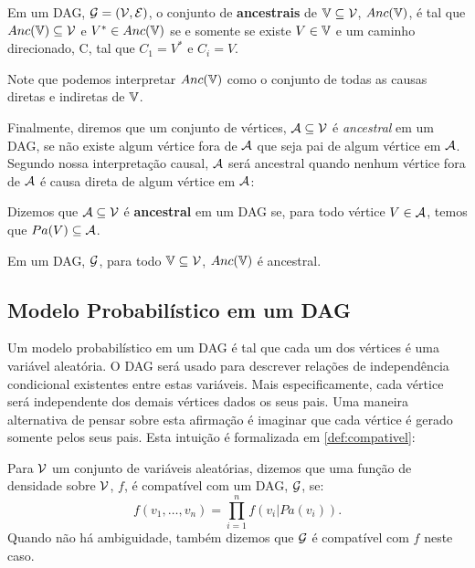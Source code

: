 \begin{definition}
 \label{def:ancestrais}
 Em um DAG, ${\mathcal G} = ({\mathcal V}, {\mathcal E})$,
 o conjunto de \textbf{ancestrais} de ${\mathbb V} \subseteq {\mathcal V}$, 
 $Anc({\mathbb V})$, é tal que
 $Anc({\mathbb V}) \subseteq {\mathcal V}$ e
 $V^* \in Anc({\mathbb V})$ se e somente se existe
 $V \in {\mathbb V}$ e
 um caminho direcionado, C, tal que
 $C_1 = V^*$ e $C_i = V$.
\end{definition}

Note que podemos interpretar $Anc({\mathbb V})$ como
o conjunto de todas as causas diretas e indiretas de ${\mathbb V}$.

Finalmente, diremos que um conjunto de vértices,
${\mathcal A} \subseteq {\mathcal V}$ é \textit{ancestral} em um DAG,
se não existe algum vértice fora de ${\mathcal A}$ que
seja pai de algum vértice em ${\mathcal A}$.
Segundo nossa interpretação causal,
${\mathcal A}$ será ancestral quando 
nenhum vértice fora de ${\mathcal A}$ 
é causa direta de 
algum vértice em ${\mathcal A}$:

\begin{definition}
 \label{def:ancestral}
 Dizemos que ${\mathcal A} \subseteq {\mathcal V}$ é 
 \textbf{ancestral} em um DAG se,
 para todo vértice $V \in {\mathcal A}$, temos que
 $Pa(V) \subseteq {\mathcal A}$.
\end{definition}

\begin{lemma}
 \label{lem:anc}
 Em um DAG, ${\mathcal G}$,
 para todo ${\mathbb V} \subseteq {\mathcal V}$, 
 $Anc({\mathbb V})$ é ancestral.
\end{lemma}

\subsection{Modelo Probabilístico em um DAG}

Um modelo probabilístico em um DAG é
tal que cada um dos vértices é uma variável aleatória.
O DAG será usado para descrever 
relações de independência condicional existentes entre
estas variáveis.
Mais especificamente, cada vértice será
independente dos demais vértices dados os seus pais.
Uma maneira alternativa de pensar sobre esta afirmação é
imaginar que cada vértice é gerado somente pelos seus pais.
Esta intuição é formalizada em \cref{def:compativel}:

\begin{definition}
 \label{def:compativel}
 Para ${\mathcal V}$ um conjunto de variáveis aleatórias,
 dizemos que uma função de densidade sobre ${\mathcal V}$, 
 $f$, é compatível com um DAG, ${\mathcal G}$, se:
 $$f(v_1,\ldots,v_n) = \prod_{i=1}^n f(v_i|Pa(v_i)).$$
 Quando não há ambiguidade, também dizemos que
 ${\mathcal G}$ é compatível com $f$ neste caso.
\end{definition}

